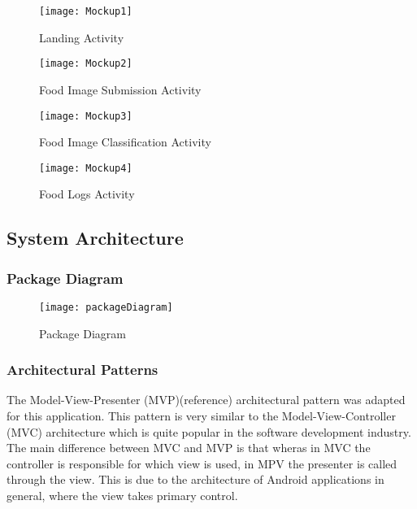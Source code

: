 \begin{figure}[h] 
  \label{ fig7} 
  \begin{minipage}[b]{0.5\linewidth}
    \centering
    \texttt{[image: Mockup1]} 
    \caption{Landing Activity} 
  \label{fig:page1}
    \vspace{4ex}
  \end{minipage}%
  \begin{minipage}[b]{0.5\linewidth}
    \centering
    \texttt{[image: Mockup2]} 
    \caption{Food Image Submission Activity} 
  \label{fig:page2}
    \vspace{4ex}
  \end{minipage} 
  \begin{minipage}[b]{0.5\linewidth}
    \centering
    \texttt{[image: Mockup3]} 
    \caption{Food Image Classification Activity} 
    \label{fig:page3}
    \vspace{4ex}
  \end{minipage}%
  \begin{minipage}[b]{0.5\linewidth}
    \centering
    \texttt{[image: Mockup4]} 
    \caption{Food Logs Activity} 
    \label{fig:page4}
    \vspace{4ex}
  \end{minipage} 
\end{figure}

\subsection*{System Architecture}

\subsubsection*{Package Diagram}
\begin{figure}[h]
    \texttt{[image: packageDiagram]}
    \caption{Package Diagram}
    \label{fig:packageDiagram}
\end{figure}

\subsubsection*{Architectural Patterns}
The Model-View-Presenter (MVP)(reference) architectural pattern was adapted for this application.
This pattern is very similar to the Model-View-Controller (MVC) architecture which is quite popular in the software development industry.
The main difference between MVC and MVP is that wheras in MVC the controller is responsible for which view is used, in MPV the presenter is called through the view.
This is due to the architecture of Android applications in general, where the view takes primary control.

